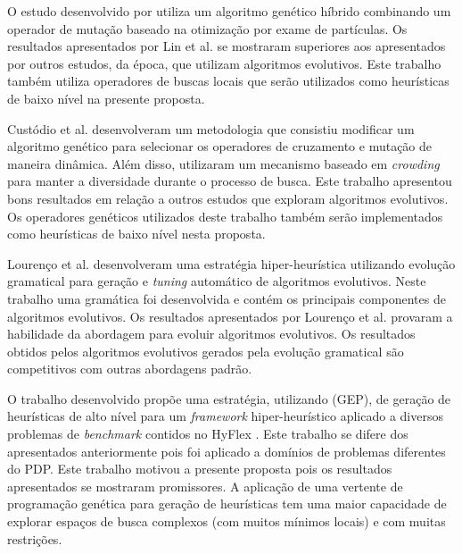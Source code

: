 O estudo desenvolvido por \cite{lin2011protein} utiliza um algoritmo genético híbrido combinando um operador de mutação baseado na otimização por exame de partículas. Os resultados apresentados por Lin et al. se mostraram superiores aos apresentados por outros estudos, da época, que utilizam algoritmos evolutivos. Este trabalho também utiliza operadores de buscas locais que serão utilizados como heurísticas de baixo nível na presente proposta. 


Custódio et al. \cite{custodio2014multiple} desenvolveram um metodologia que consistiu modificar um algoritmo genético para selecionar os operadores de cruzamento e mutação de maneira dinâmica. Além disso, utilizaram um mecanismo baseado em \textit{crowding}  para manter a diversidade durante o processo de busca. Este trabalho apresentou bons resultados em relação a outros estudos que exploram algoritmos evolutivos. Os operadores genéticos utilizados deste trabalho também serão implementados como heurísticas de baixo nível nesta proposta. 


Lourenço et al. \cite{lourencco2012evolving} desenvolveram uma estratégia hiper-heurística utilizando evolução gramatical para geração e \textit{tuning} automático de algoritmos evolutivos. Neste trabalho uma gramática foi desenvolvida e contém os principais componentes de algoritmos evolutivos. Os resultados apresentados por Lourenço et al. provaram a habilidade da abordagem para evoluir algoritmos evolutivos. Os resultados obtidos pelos algoritmos evolutivos gerados pela evolução gramatical são competitivos com outras abordagens padrão.


O trabalho desenvolvido \cite{sabar2015automatic} propõe uma estratégia, utilizando  (GEP), de geração de heurísticas de alto nível para um \textit {framework} hiper-heurístico aplicado a diversos problemas de \textit{benchmark} contidos no  HyFlex \cite{ochoa2012hyflex}. Este trabalho se difere dos apresentados anteriormente pois foi aplicado a domínios de problemas diferentes do PDP. Este trabalho motivou a presente proposta pois os resultados apresentados se mostraram promissores. A aplicação de uma vertente de programação genética para geração de heurísticas tem uma maior capacidade de explorar espaços de busca complexos (com muitos mínimos locais) e com muitas restrições.


